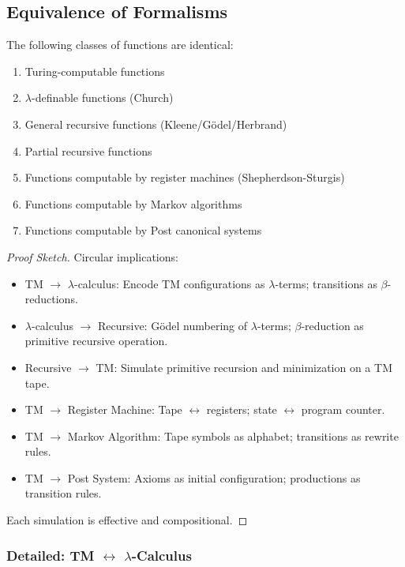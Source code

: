 \subsection{Equivalence of Formalisms}
\label{sec:computation:equivalence}

\begin{theorem}
The following classes of functions are identical:
\begin{enumerate}
\item Turing-computable functions
\item $\lambda$-definable functions (Church)
\item General recursive functions (Kleene/G\"odel/Herbrand)
\item Partial recursive functions
\item Functions computable by register machines (Shepherdson-Sturgis)
\item Functions computable by Markov algorithms
\item Functions computable by Post canonical systems
\end{enumerate}
\end{theorem}

\begin{proof}[Proof Sketch]
Circular implications:
\begin{itemize}
\item TM $\to$ $\lambda$-calculus: Encode TM configurations as $\lambda$-terms; transitions as $\beta$-reductions.
\item $\lambda$-calculus $\to$ Recursive: G\"odel numbering of $\lambda$-terms; $\beta$-reduction as primitive recursive operation.
\item Recursive $\to$ TM: Simulate primitive recursion and minimization on a TM tape.
\item TM $\to$ Register Machine: Tape $\leftrightarrow$ registers; state $\leftrightarrow$ program counter.
\item TM $\to$ Markov Algorithm: Tape symbols as alphabet; transitions as rewrite rules.
\item TM $\to$ Post System: Axioms as initial configuration; productions as transition rules.
\end{itemize}
Each simulation is effective and compositional.
\end{proof}

\subsubsection*{Detailed: TM $\leftrightarrow$ $\lambda$-Calculus}

